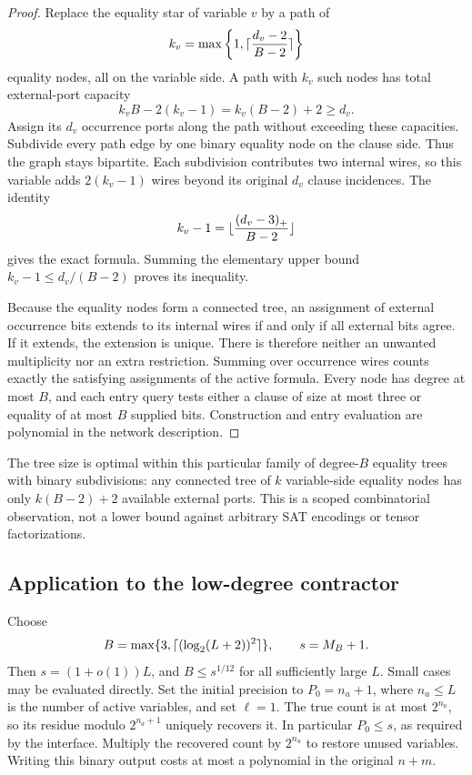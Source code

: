 \begin{proof}
Replace the equality star of variable $v$ by a path of
\[
 k_v=\max\left\{1,\lceil\frac{d_v-2}{B-2}\rceil\right\}
\]
equality nodes, all on the variable side. A path with $k_v$ such nodes
has total external-port capacity
\[
 k_vB-2(k_v-1)=k_v(B-2)+2\ge d_v.
\]
Assign its $d_v$ occurrence ports along the path without exceeding these
capacities. Subdivide every path edge by one binary equality node on the
clause side. Thus the graph stays bipartite. Each subdivision contributes
two internal wires, so this variable adds $2(k_v-1)$ wires beyond its
original $d_v$ clause incidences. The identity
\[
 k_v-1=\lfloor\frac{(d_v-3)_+}{B-2}\rfloor
\]
gives the exact formula. Summing the elementary upper bound
$k_v-1\le d_v/(B-2)$ proves its inequality.

Because the equality nodes form a connected tree, an assignment of
external occurrence bits extends to its internal wires if and only if
all external bits agree. If it extends, the extension is unique. There
is therefore neither an unwanted multiplicity nor an extra restriction.
Summing over occurrence wires counts exactly the satisfying assignments
of the active formula. Every node has degree at most $B$, and each
entry query tests either a clause of size at most three or equality of
at most $B$ supplied bits. Construction and entry evaluation are
polynomial in the network description.
\end{proof}

The tree size is optimal within this particular family of degree-$B$
equality trees with binary subdivisions: any connected tree of $k$
variable-side equality nodes has only $k(B-2)+2$ available external
ports. This is a scoped combinatorial observation, not a lower bound
against arbitrary SAT encodings or tensor factorizations.

\subsection{Application to the low-degree contractor}

Choose
\[
 B=\max\{3,\lceil(\log_2(L+2))^2\rceil\},\qquad s=M_B+1.
\]
Then $s=(1+o(1))L$, and $B\le s^{1/12}$ for all sufficiently large
$L$. Small cases may be evaluated directly. Set the initial precision
to $P_0=n_a+1$, where $n_a\le L$ is the number of active variables,
and set $\ell=1$. The true count is at most $2^{n_a}$, so its residue
modulo $2^{n_a+1}$ uniquely recovers it. In particular $P_0\le s$,
as required by the interface. Multiply the recovered count by $2^{n_u}$
to restore unused variables. Writing this binary output costs at most
a polynomial in the original $n+m$.

